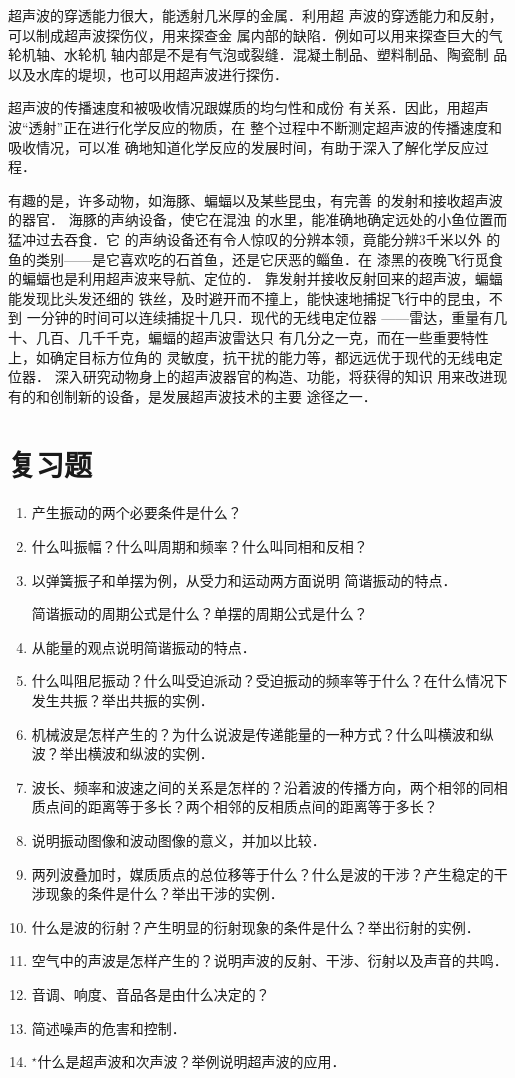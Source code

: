 超声波的穿透能力很大，能透射几米厚的金属．利用超
声波的穿透能力和反射，可以制成超声波探伤仪，用来探查金
属内部的缺陷．例如可以用来探查巨大的气轮机轴、水轮机
轴内部是不是有气泡或裂缝．混凝土制品、塑料制品、陶瓷制
品以及水库的堤坝，也可以用超声波进行探伤．

超声波的传播速度和被吸收情况跟媒质的均匀性和成份
有关系．因此，用超声波“透射”正在进行化学反应的物质，在
整个过程中不断测定超声波的传播速度和吸收情况，可以准
确地知道化学反应的发展时间，有助于深入了解化学反应过
程．

有趣的是，许多动物，如海豚、蝙蝠以及某些昆虫，有完善
的发射和接收超声波的器官．
海豚的声纳设备，使它在混浊
的水里，能准确地确定远处的小鱼位置而猛冲过去吞食．它
的声纳设备还有令人惊叹的分辨本领，竟能分辨3千米以外
的鱼的类别——是它喜欢吃的石首鱼，还是它厌恶的鲻鱼．在
漆黑的夜晚飞行觅食的蝙蝠也是利用超声波来导航、定位的．
靠发射并接收反射回来的超声波，蝙蝠能发现比头发还细的
铁丝，及时避开而不撞上，能快速地捕捉飞行中的昆虫，不到
一分钟的时间可以连续捕捉十几只．现代的无线电定位器
——雷达，重量有几十、几百、几千千克，蝙蝠的超声波雷达只
有几分之一克，而在一些重要特性上，如确定目标方位角的
灵敏度，抗干扰的能力等，都远远优于现代的无线电定位器．
深入研究动物身上的超声波器官的构造、功能，将获得的知识
用来改进现有的和创制新的设备，是发展超声波技术的主要
途径之一．

\section*{复习题}
\begin{enumerate}
    \item 产生振动的两个必要条件是什么？
    \item 什么叫振幅？什么叫周期和频率？什么叫同相和反相？
    \item 以弹簧振子和单摆为例，从受力和运动两方面说明
简谐振动的特点．

简谐振动的周期公式是什么？单摆的周期公式是什么？

\item 从能量的观点说明简谐振动的特点．
\item 什么叫阻尼振动？什么叫受迫派动？受迫振动的频率等于什么？在什么情况下发生共振？举出共振的实例．
\item 机械波是怎样产生的？为什么说波是传递能量的一种方式？什么叫横波和纵波？举出横波和纵波的实例．
\item 波长、频率和波速之间的关系是怎样的？沿着波的传播方向，两个相邻的同相质点间的距离等于多长？两个相邻的反相质点间的距离等于多长？
\item 说明振动图像和波动图像的意义，并加以比较．
\item 两列波叠加时，媒质质点的总位移等于什么？什么是波的干涉？产生稳定的干涉现象的条件是什么？举出干涉的实例．
\item 什么是波的衍射？产生明显的衍射现象的条件是什么？举出衍射的实例．
\item 空气中的声波是怎样产生的？说明声波的反射、干涉、衍射以及声音的共鸣．
\item 音调、响度、音品各是由什么决定的？
\item 简述噪声的危害和控制．
\item $^\star $什么是超声波和次声波？举例说明超声波的应用．
\end{enumerate}



